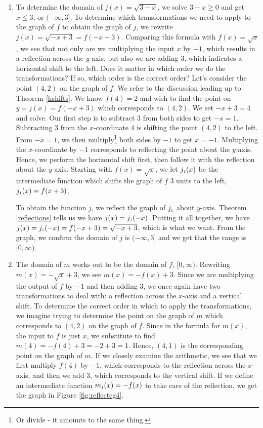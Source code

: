 {\begin{enumerate}
\item  To determine the domain of  $j(x) = \sqrt{3-x}$, we solve $3-x \geq 0$ and get $x \leq 3$, or $(-\infty, 3]$.  To determine which transformations we need to apply to the graph of $f$ to obtain the graph of $j$, we rewrite $j(x) = \sqrt{-x+3} = f(-x+3)$. Comparing this formula with $f(x) = \sqrt{x}$, we see that not only are we multiplying the input $x$ by $-1$, which results in a reflection across the $y$-axis, but also we are adding $3$, which indicates a horizontal shift to the left.  Does it matter in which order we do the transformations?  If so, which order is the correct order?  Let's consider the point $(4,2)$ on the graph of $f$.  We refer to the discussion leading up to Theorem \ref{hshifts}.  We know $f(4) = 2$ and wish to find the point on $y=j(x) = f(-x+3)$ which corresponds to $(4,2)$.  We set $-x+3 = 4$ and solve.  Our first step is to subtract $3$ from both sides to get $-x=1$.  Subtracting $3$ from the $x$-coordinate $4$ is shifting the point $(4,2)$ to the left.   From $-x=1$, we then multiply\footnote{Or divide - it amounts to the same thing.} both sides by $-1$ to get $x=-1$.  Multiplying the $x$-coordinate by $-1$ corresponds to reflecting the point about the $y$-axis.  Hence, we perform the horizontal shift first, then follow it with the reflection about the $y$-axis.  Starting with $f(x) = \sqrt{x}$, we let $j_{\mbox{\tiny$1$}}(x)$ be the intermediate function which shifts the graph of $f$ $3$ units to the left, $j_{\mbox{\tiny$1$}}(x) = f(x+3)$. 

To obtain the function $j$, we reflect the graph of $j_{\mbox{\tiny$1$}}$ about $y$-axis.   Theorem \ref{reflections} tells us we have $j(x) = j_{\mbox{\tiny$1$}}(-x)$. Putting it all together, we have $j(x) = j_{\mbox{\tiny$1$}}(-x) = f(-x+3) = \sqrt{-x+3}$, which is what we want. From the graph, we confirm the domain of $j$ is $(-\infty, 3]$ and we get that the range is $[0, \infty)$.



\item  The domain of $m$ works out to be the domain of $f$, $[0, \infty)$.  Rewriting $m(x) = -\sqrt{x} + 3$, we see $m(x) = -f(x) + 3$.  Since we are multiplying the output of $f$ by $-1$ and then adding $3$, we once again have two transformations to deal with:  a reflection across the $x$-axis and a vertical shift.  To determine the correct order in which to apply the transformations, we imagine trying to determine the point on the graph of $m$ which corresponds to $(4,2)$ on the graph of $f$.  Since in the formula for $m(x)$, the input to $f$ is just $x$, we substitute to find  $m(4) = -f(4)+3 = -2+3=1$.  Hence, $(4,1)$ is the corresponding point on the graph of $m$. If we closely examine the arithmetic, we see that we first multiply $f(4)$ by $-1$, which corresponds to the reflection across the $x$-axis, and then we add $3$, which corresponds to the vertical shift.  If we define an intermediate function $m_{\mbox{\tiny$1$}}(x) = -f(x)$ to take care of the reflection, we get the graph in Figure \ref{fig:reflecteg4}.


\end{enumerate}}
